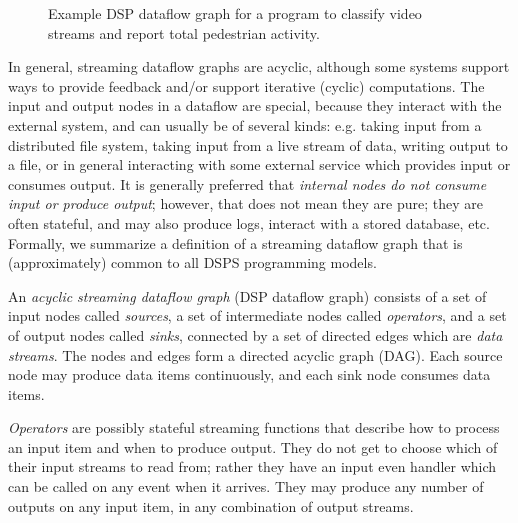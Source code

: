 \begin{figure}[t]
\centering
{}

\caption[Example DSP dataflow graph.]{Example DSP dataflow graph for a program to classify video streams and report total pedestrian activity.}
\label{fig:dataflow-example}
\end{figure}

In general, streaming dataflow graphs are acyclic, although some systems support ways to provide feedback and/or support iterative (cyclic) computations.
The input and output nodes in a dataflow are special, because they interact with the external system, and can usually be of several kinds: e.g. taking input from a distributed file system, taking input from a live stream of data, writing output to a file, or in general interacting with some external service which provides input or consumes output.
It is generally preferred that \emph{internal nodes do not consume input or produce output}; however, that does not mean they are pure; they are often stateful, and may also produce logs, interact with a stored database, etc.
Formally, we summarize a definition of a streaming dataflow graph that is (approximately) common to all DSPS programming models.

\begin{definition}
\label{def:dataflow-graph}
An \emph{acyclic streaming dataflow graph} (DSP dataflow graph) consists of a set of input nodes called \emph{sources}, a set of intermediate nodes
called \emph{operators}, and a set of output nodes called \emph{sinks}, connected by a set of
directed edges which are \emph{data streams}.
The nodes and edges form a directed acyclic graph (DAG).
Each source node may produce data items continuously, and each sink node consumes data items.

\emph{Operators} are possibly stateful streaming functions that describe how to process an input item and when to produce output. They do not get to choose which of their input streams to read from; rather they have an input even handler which can be called on any event when it arrives.
They may produce any number of outputs on any input item, in any combination of output streams.
\end{definition}

